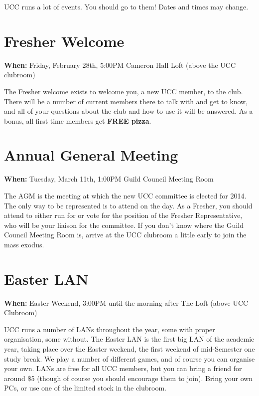 
UCC runs a lot of events. You should go to them! Dates and times may change. 

\newenvironment{event}[3]
{
	\begin{mdframed}[backgroundcolor=white,nobreak=true]
		\color{black}{\section{#1}}
		\begin{mdframed}[backgroundcolor=white]
			When: #2
			Where: #3
		\end{mdframed}
}{
	\end{mdframed}
}

\renewenvironment{event}[3]
{
	\section{#1}
	{\bf When:} #2
	 #3

}{}





\begin{event}{Fresher Welcome}{Friday, February 28th, 5:00PM}{Cameron Hall Loft (above the UCC clubroom)}
The Fresher welcome exists to welcome you, a new UCC member, to the club. There will be a number of current members there to talk with and get to know, and all of your questions about the club and how to use it will be answered. As a bonus, all first time members get {\bf FREE pizza}.
\end{event}

\begin{event}{Annual General Meeting}{Tuesday, March 11th, 1:00PM}{Guild Council Meeting Room}
The AGM is the meeting at which the new UCC committee is elected for 2014. The only way to be represented is to attend on the day. As a Fresher, you should attend to either run for or vote for the position of the Fresher Representative, who will be your liaison for the committee. If you don't know where the Guild Council Meeting Room is, arrive at the UCC clubroom a little early to join the mass exodus.
\end{event}

\begin{event}{Easter LAN}{Easter Weekend, 3:00PM until the morning after}{The Loft (above UCC Clubroom)}
UCC runs a number of LANs throughout the year, some with proper organisation, some without. The Easter LAN is the first big LAN of the academic year, taking place over the Easter weekend, the first weekend of mid-Semester one study break. We play a number of different games, and of course you can organise your own. LANs are free for all UCC members, but you can bring a friend for around \$5 (though of course you should encourage them to join). Bring your own PCs, or use one of the limited stock in the clubroom.
\end{event}

